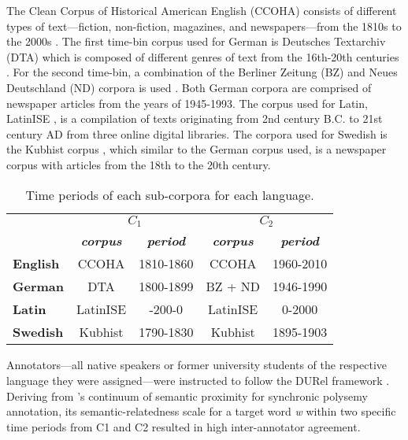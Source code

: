 The Clean Corpus of Historical American English (CCOHA) consists of different types of text—fiction, non-fiction, magazines, and newspapers—from the 1810s to the 2000s \citep{davies2012expanding, alatrash-etal-2020-ccoha}. The first time-bin corpus used for German is Deutsches Textarchiv (DTA) which is composed of different genres of text from the 16th-20th centuries \citep{dta2017}. For the second time-bin, a combination of the Berliner Zeitung (BZ) and Neues Deutschland (ND) corpora is used \citep{berliner2018,neues2018}. Both German corpora are comprised of newspaper articles from the years of 1945-1993. The corpus used for Latin, LatinISE \citep{mcgillivray-kilgarriff}, is a compilation of texts originating from 2nd century B.C. to 21st century AD from three online digital libraries. The corpora used for Swedish is the Kubhist corpus \citep{Kubhist}, which similar to the German corpus used, is a newspaper corpus with articles from the 18th to the 20th century. \hfill \break
\begin{table}[h]
\small
\centering
\begin{tabular}{l|cc|cc|}
\cline{2-5}
\textbf{}      & \multicolumn{2}{c|}{\textbf{$C_1$}}                    & \multicolumn{2}{c|}{\textbf{$C_2$}}                    \\
                                       & \textit{\textbf{corpus}} & \textit{\textbf{period}} & \textit{\textbf{corpus}} & \textit{\textbf{period}} \\ \hline
\multicolumn{1}{|l|}{\textbf{English}} & CCOHA                    & 1810-1860                & CCOHA                    & 1960-2010                \\ \hline
\multicolumn{1}{|l|}{\textbf{German}}  & DTA                      & 1800-1899                & BZ + ND                  & 1946-1990                \\ \hline
\multicolumn{1}{|l|}{\textbf{Latin}}   & LatinISE                 & -200-0                   & LatinISE                 & 0-2000                   \\ \hline
\multicolumn{1}{|l|}{\textbf{Swedish}} & Kubhist                  & 1790-1830                & Kubhist                  & 1895-1903                \\ \hline
\end{tabular}
\caption{Time periods of each sub-corpora for each language.}
\label{tab:subcorpora-time}
\end{table}
\hfill \break
Annotators—all native speakers or former university students of the respective language they were assigned—were instructed to follow the DURel framework \citep{DURel2018}. Deriving from \citet{blank1997prinzipien}’s continuum of semantic proximity for synchronic polysemy annotation, its semantic-relatedness scale for a target word \emph{w} within two specific time periods from C1 and C2 resulted in high inter-annotator agreement. 
	
